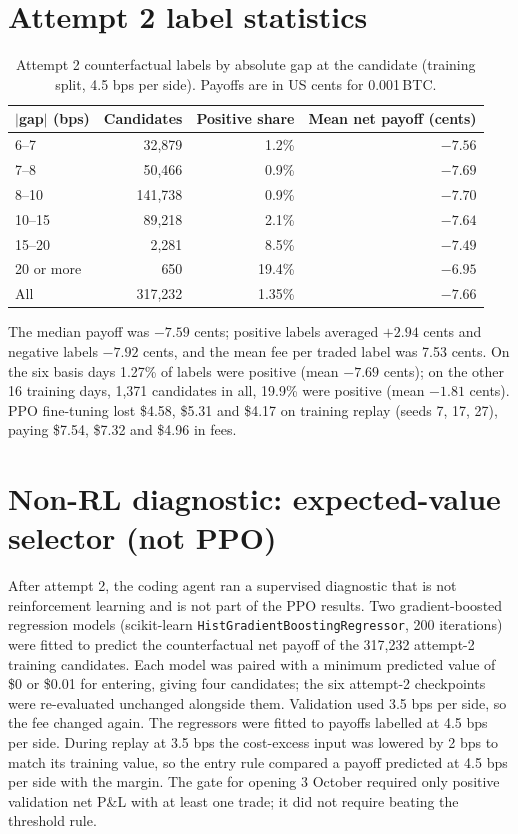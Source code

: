 \documentclass[12pt,a4paper]{article}
\DeclareRobustCommand{\bps}{\ifmmode\,\text{bps}\else\,bps\fi}
\begin{document}
\section{Attempt 2 label statistics}\label{app:labels}
\begin{table}[H]
\centering
\caption{Attempt 2 counterfactual labels by absolute gap at the candidate (training split,
4.5\bps{} per side). Payoffs are in US cents for 0.001\,BTC.}
\label{tab:labels}
\begin{tabular}{@{}lrrr@{}}
\toprule
$|$gap$|$ (bps) & Candidates & Positive share & Mean net payoff (cents) \\
\midrule
6--7    & 32,879  & 1.2\%  & $-7.56$ \\
7--8    & 50,466  & 0.9\%  & $-7.69$ \\
8--10   & 141,738 & 0.9\%  & $-7.70$ \\
10--15  & 89,218  & 2.1\%  & $-7.64$ \\
15--20  & 2,281   & 8.5\%  & $-7.49$ \\
20 or more & 650  & 19.4\% & $-6.95$ \\
\midrule
All     & 317,232 & 1.35\% & $-7.66$ \\
\bottomrule
\end{tabular}
\end{table}
The median payoff was $-7.59$ cents; positive labels averaged $+2.94$ cents and negative
labels $-7.92$ cents, and the mean fee per traded label was 7.53 cents. On the six basis days
1.27\% of labels were positive (mean $-7.69$ cents); on the other 16 training days, 1,371
candidates in all, 19.9\% were positive (mean $-1.81$ cents). PPO fine-tuning lost \$4.58,
\$5.31 and \$4.17 on training replay (seeds 7, 17, 27), paying \$7.54, \$7.32 and \$4.96 in fees.

\section{Non-RL diagnostic: expected-value selector (not PPO)}\label{app:value}
After attempt 2, the coding agent ran a supervised diagnostic that is not reinforcement
learning and is not part of the PPO results. Two gradient-boosted regression models
(scikit-learn \texttt{HistGradientBoostingRegressor}, 200 iterations) were fitted to predict
the counterfactual net payoff of the 317,232 attempt-2 training candidates. Each model was
paired with a minimum predicted value of \$0 or \$0.01 for entering, giving four candidates;
the six attempt-2 checkpoints were re-evaluated unchanged alongside them. Validation used
3.5\bps{} per side, so the fee changed again. The regressors were fitted to payoffs labelled
at 4.5\bps{} per side. During replay at 3.5\bps{} the cost-excess input was lowered by 2\bps{}
to match its training value, so the entry rule compared a payoff predicted at 4.5\bps{} per
side with the margin. The gate for opening 3 October required only positive validation net
P\&L with at least one trade; it did not require beating the threshold rule.
\end{document}
